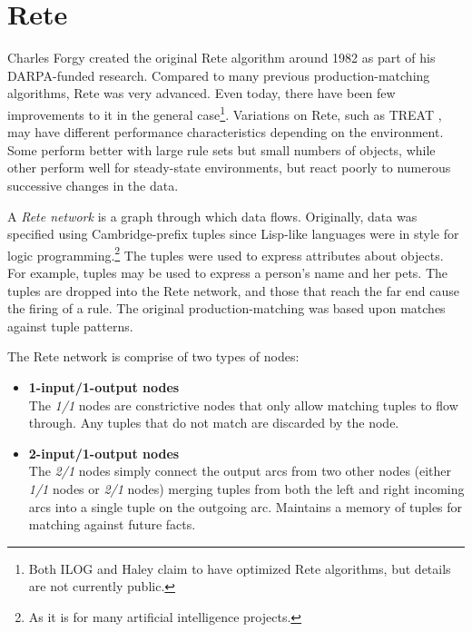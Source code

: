 \section{Rete}
\label{algo.rete}

Charles Forgy created the original Rete algorithm\cite{forgy82rete} 
around 1982 as part
of his DARPA-funded research.  Compared to many previous
production-matching algorithms, Rete was very advanced.  Even today,
there have been few improvements to it in the general
case\footnote{Both ILOG and Haley claim to have optimized Rete
algorithms, but details are not currently public.}.  Variations on 
Rete, such as TREAT \cite{miranker87treat}, may have different performance characteristics
depending on the environment.  Some perform better with large rule 
sets but small numbers of objects, while other perform well for 
steady-state environments, but react poorly to numerous successive 
changes in the data.

A \emph{Rete network} is a graph through which data flows.
Originally, data was specified using Cambridge-prefix tuples since
Lisp-like languages were in style for logic programming.\footnote{As it is for many artificial
intelligence projects.}  The tuples were used to express attributes
about objects.  For example, tuples may be used to express a person's
name and her pets.  The tuples are dropped into the Rete network,
and those that reach the far end cause the firing of a rule.
The original production-matching was based upon matches against
tuple patterns.

\bigskip

The Rete network is comprise of two types of nodes:

\begin{itemize}
	\item \textbf{\textsf{1-input/1-output nodes}}\\
		The \emph{1/1} nodes are
		constrictive nodes that only allow matching tuples to
		flow through.  Any tuples that do not match are discarded
		by the node.
	\item \textbf{\textsf{2-input/1-output nodes}}\\
		The \emph{2/1} nodes simply connect the output arcs from two
		other nodes (either \emph{1/1} nodes or \emph{2/1} nodes) merging
		tuples from both the left and right incoming arcs
		into a single tuple on the outgoing arc.  Maintains a memory
		of tuples for matching against future facts.
\end{itemize}

